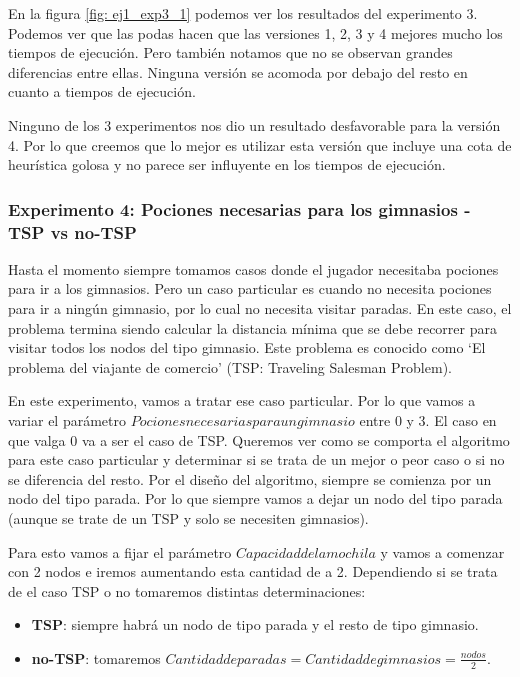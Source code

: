 \par En la figura \ref{fig: ej1_exp3_1} podemos ver los resultados del experimento 3. Podemos ver que las podas hacen que las versiones 1, 2, 3 y 4 mejores mucho los tiempos de ejecución. Pero también notamos que no se observan grandes diferencias entre ellas. Ninguna versión se acomoda por debajo del resto en cuanto a tiempos de ejecución.

\par Ninguno de los 3 experimentos nos dio un resultado desfavorable para la versión 4. Por lo que creemos que lo mejor es utilizar esta versión que incluye una cota de heurística golosa y no parece ser influyente en los tiempos de ejecución.


\subsubsection{Experimento 4: Pociones necesarias para los gimnasios - TSP vs no-TSP}

\par Hasta el momento siempre tomamos casos donde el jugador necesitaba pociones para ir a los gimnasios. Pero un caso particular es cuando no necesita pociones para ir a ningún gimnasio, por lo cual no necesita visitar paradas. En este caso, el problema termina siendo calcular la distancia mínima que se debe recorrer para visitar todos los nodos del tipo gimnasio. Este problema es conocido como `El problema del viajante de comercio' (TSP: Traveling Salesman Problem).

\par En este experimento, vamos a tratar ese caso particular. Por lo que vamos a variar el parámetro $Pociones necesarias para un gimnasio$ entre 0 y 3. El caso en que valga 0 va a ser el caso de TSP. Queremos ver como se comporta el algoritmo para este caso particular y determinar si se trata de un mejor o peor caso o si no se diferencia del resto. Por el diseño del algoritmo, siempre se comienza por un nodo del tipo parada. Por lo que siempre vamos a dejar un nodo del tipo parada (aunque se trate de un TSP y solo se necesiten gimnasios).

\par Para esto vamos a fijar el parámetro $Capacidad de la mochila$ y vamos a comenzar con 2 nodos e iremos aumentando esta cantidad de a 2. Dependiendo si se trata de el caso TSP o no tomaremos distintas determinaciones:

\begin{itemize}
	\item \textbf{TSP}: siempre habrá un nodo de tipo parada y el resto de tipo gimnasio.
	\item \textbf{no-TSP}: tomaremos $Cantidad de paradas = Cantidad de gimnasios = \frac{nodos}{2}$.
\end{itemize}

